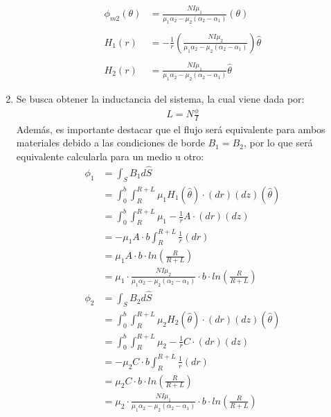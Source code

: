 \documentclass[
  11pt,
  letterpaper,
   addpoints,
   answers
  ]{exam}
\begin{document}
\begin{questions}
\begin{solution}
\begin{enumerate}
\begin{align}
                \phi_{m2}(\theta) &= \frac{NI \mu_{1}}{\mu_{1}\alpha_{2} - \mu_{2}(\alpha_{2} - \alpha_{1})}(\theta) \\\\
                H_{1}(r) &= -\frac{1}{r} \left( \frac{NI \mu_{2}}{\mu_{1}\alpha_{2} - \mu_{2} (\alpha_{2} - \alpha_{1})} \right) \hat{\theta}\\\\
                H_{2}(r) &=  \frac{NI \mu_{1}}{\mu_{1}\alpha_{2} - \mu_{2}(\alpha_{2} - \alpha_{1})}\hat{\theta}
            \end{align}

        \item Se busca obtener la inductancia del sistema, la cual viene dada por:
\begin{align}
  L= N\frac{\phi}{I}    
\end{align}
Además, es importante destacar que el flujo será equivalente para ambos materiales debido a las condiciones de borde $B_{1} = B_{2}$, por lo que será equivalente calcularla para un medio u otro:
\begin{align}
    \phi_{1} &= \int_{S} B_{1} d\hat{S}\\
         &= \int_{0}^{b} \int_{R}^{R+L} \mu_{1}H_{1} (\hat{\theta}) \cdot  (dr) (dz) (\hat{\theta})\\
         &= \int_{0}^{b} \int_{R}^{R+L} \mu_{1} -\frac{1}{r} A  \cdot  (dr) (dz) \\
         &= -\mu_{1}A \cdot b  \int_{R}^{R+L} \frac{1}{r} (dr) \\
         &= \mu_{1} A\cdot b \cdot ln\left(\frac{R}{R+L}\right)\\
         &= \mu_{1}\cdot  \frac{NI \mu_{2}}{\mu_{1}\alpha_{2} - \mu_{2} (\alpha_{2} - \alpha_{1})}  \cdot b \cdot ln\left(\frac{R}{R+L}\right)
\end{align}
\begin{align}
    \phi_{2} &= \int_{S} B_{2} d\hat{S}\\
         &= \int_{0}^{b} \int_{R}^{R+L} \mu_{2}H_{2} (\hat{\theta}) \cdot  (dr) (dz) (\hat{\theta})\\
         &= \int_{0}^{b} \int_{R}^{R+L} \mu_{2} -\frac{1}{r} C  \cdot  (dr) (dz) \\
         &= -\mu_{2}C \cdot b  \int_{R}^{R+L} \frac{1}{r} (dr)\\
         &= \mu_{2} C\cdot b \cdot ln\left(\frac{R}{R+L}\right)\\
         &= \mu_{2}\cdot  \frac{NI \mu_{1}}{\mu_{1}\alpha_{2} - \mu_{2}(\alpha_{2} - \alpha_{1})}   \cdot b \cdot ln\left(\frac{R}{R+L}\right)

\end{align}
\end{enumerate}
\end{solution}
\end{questions}
\end{document}
